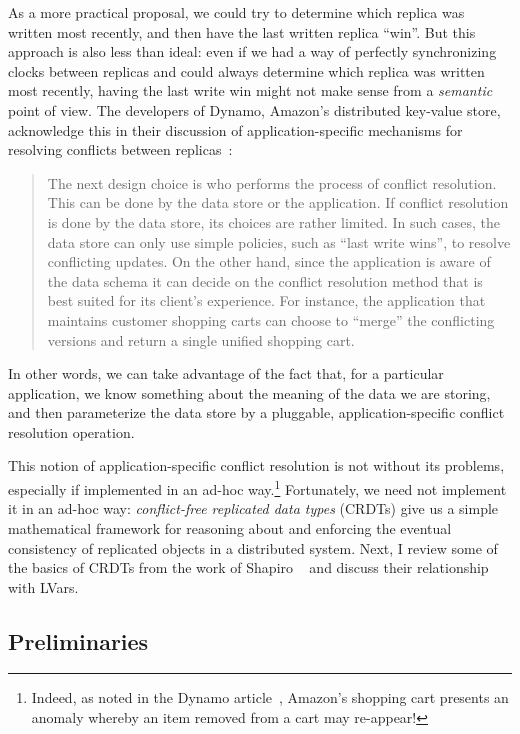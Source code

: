 \documentclass{article}
\begin{document}
As a more practical proposal, we could try to determine which replica
was written most recently, and then have the last written replica
``win''.  But this approach is also less than ideal: even if we had a
way of perfectly synchronizing clocks between replicas and could
always determine which replica was written most recently, having the
last write win might not make sense from a \emph{semantic} point of
view.  The developers of Dynamo, Amazon's distributed key-value store,
acknowledge this in their discussion of application-specific
mechanisms for resolving conflicts between replicas~\cite{dynamo}:
\begin{quote}
  The next design choice is who performs the process of conflict
  resolution. This can be done by the data store or the
  application. If conflict resolution is done by the data store, its
  choices are rather limited. In such cases, the data store can only
  use simple policies, such as ``last write wins'', to resolve
  conflicting updates. On the other hand, since the application is
  aware of the data schema it can decide on the conflict resolution
  method that is best suited for its client’s experience. For
  instance, the application that maintains customer shopping carts can
  choose to ``merge'' the conflicting versions and return a single
  unified shopping cart.
\end{quote}
In other words, we can take advantage of the fact that, for a
particular application, we know something about the meaning of the
data we are storing, and then parameterize the data store by a
pluggable, application-specific conflict resolution operation.

This notion of application-specific conflict resolution is not without
its problems, especially if implemented in an ad-hoc
way.\footnote{Indeed, as noted in the Dynamo article~\cite{dynamo},
  Amazon's shopping cart presents an anomaly whereby an item removed
  from a cart may re-appear!}  Fortunately, we need not implement it
in an ad-hoc way: \emph{conflict-free replicated data types} (CRDTs)
give us a simple mathematical framework for reasoning about and
enforcing the eventual consistency of replicated objects in a
distributed system.  Next, I review some of the basics of CRDTs from
the work of Shapiro \etal~\cite{crdts, crdts-tr} and discuss their
relationship with LVars.

\subsection{Preliminaries}
\end{document}
